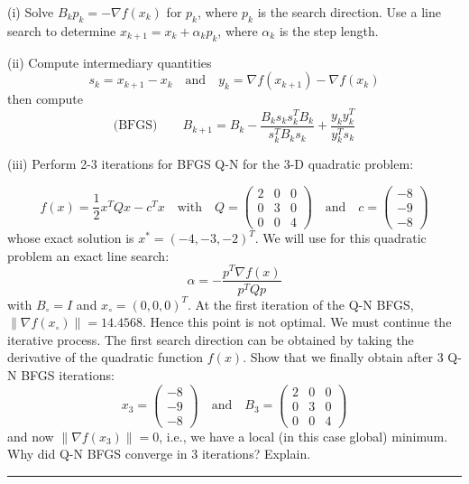 \documentclass [11point]{article}
\begin{document}
\medskip

(i) Solve $B_k p_k = -\nabla f(x_k)$ for $p_k$, where $p_k$ is the search direction. Use a line search to determine $x_{k+1} = x_k + \alpha_k p_k$, where $\alpha_k$ is the step length.

\medskip

(ii) Compute intermediary quantities 
$$ s_k = x_{k+1} - x_k 
\quad \mbox{and} \quad 
y_k = \nabla f(x_{k+1}) - \nabla f(x_k)$$
then compute $$ \mbox{(BFGS)} \qquad  B_{k+1} = B_k  - \frac{B_k s_k s_k^T B_k}{s_k^TB_ks_k} + \frac{y_k y_k^T}{y_k^T s_k}$$

\medskip

(iii) Perform 2-3 iterations for BFGS Q-N for the 3-D quadratic problem: 

$$
f(x) = \frac{1}{2} x^T Q x -c^T x \quad \mbox{with} \quad  
Q = \left( \begin{array}{ccc}
2 & 0 & 0 \\
0 & 3 & 0 \\
0 & 0 & 4 \end{array} \right)     \quad \mbox{and} \quad 
c =  \left( \begin{array}{c}
-8 \\
-9 \\
-8 \end{array} \right) 
$$
whose exact solution is $x^* = (-4,-3,-2)^T$. We will use for this quadratic problem an exact line search:$$ \alpha = - \frac{p^T \nabla f(x)}{p^T Q p}$$
with $B_{\circ} = I$ and $x_{\circ} = (0,0,0)^T$. At the first iteration of the Q-N BFGS, $\lVert \nabla f(x_{\circ}) \rVert = 14.4568$. Hence this point is not optimal. We must continue the iterative process. The first search direction can be obtained by taking the derivative of the quadratic function $f(x)$. Show that we finally obtain after 3 Q-N BFGS iterations: $$
x_3 =  \left( \begin{array}{c}
-8 \\
-9 \\
-8 \end{array} \right)
\quad \mbox{and} \quad
B_3 = \left( \begin{array}{ccc}
2 & 0 & 0 \\
0 & 3 & 0 \\
0 & 0 & 4 \end{array} \right)    
$$
and now $\lVert \nabla f(x_3) \rVert = 0$, i.e., we have a local (in this case global) minimum. Why did Q-N BFGS converge in 3 iterations? Explain.

\bigskip
\hrule 
\end{document}
